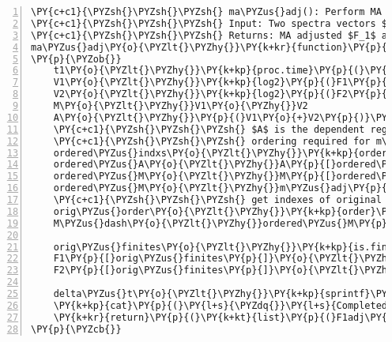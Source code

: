 \begin{Verbatim}[commandchars=\\\{\},codes={\catcode`\$=3\catcode`\^=7\catcode`\_=8},gobble=0,numbers=left,fontfamily=fvm,fontshape=n,fontsize=\footnotesize,tabsize=2]
\PY{c+c1}{\PYZsh{}\PYZsh{}\PYZsh{} ma\PYZus{}adj(): Perform MA adjustment on two vectors}
\PY{c+c1}{\PYZsh{}\PYZsh{}\PYZsh{} Input: Two spectra vectors $F_1$ and $F_2$}
\PY{c+c1}{\PYZsh{}\PYZsh{}\PYZsh{} Returns: MA adjusted $F_1$ and $F_2$ values, $F_1^*$ and $F_2^*$ respectively}
ma\PYZus{}adj\PY{o}{\PYZlt{}\PYZhy{}}\PY{k+kr}{function}\PY{p}{(}F1\PY{p}{,}F2\PY{p}{)}
\PY{p}{\PYZob{}}
	t1\PY{o}{\PYZlt{}\PYZhy{}}\PY{k+kp}{proc.time}\PY{p}{(}\PY{p}{)}\PY{p}{[}\PY{l+m}{3}\PY{p}{]} \PY{c+c1}{\PYZsh{}\PYZsh{}\PYZsh{} get start time}
	V1\PY{o}{\PYZlt{}\PYZhy{}}\PY{k+kp}{log2}\PY{p}{(}F1\PY{p}{)} \PY{c+c1}{\PYZsh{} Will produce $-\infty$ for $\log_2(0)$}
	V2\PY{o}{\PYZlt{}\PYZhy{}}\PY{k+kp}{log2}\PY{p}{(}F2\PY{p}{)}
	M\PY{o}{\PYZlt{}\PYZhy{}}V1\PY{o}{\PYZhy{}}V2
	A\PY{o}{\PYZlt{}\PYZhy{}}\PY{p}{(}V1\PY{o}{+}V2\PY{p}{)}\PY{o}{/}\PY{l+m}{2}
	\PY{c+c1}{\PYZsh{}\PYZsh{}\PYZsh{} $A$ is the dependent regression variable,}
	\PY{c+c1}{\PYZsh{}\PYZsh{}\PYZsh{} ordering required for m\PYZus{}adj function}
	ordered\PYZus{}indxs\PY{o}{\PYZlt{}\PYZhy{}}\PY{k+kp}{order}\PY{p}{(}A\PY{p}{)}
	ordered\PYZus{}A\PY{o}{\PYZlt{}\PYZhy{}}A\PY{p}{[}ordered\PYZus{}indxs\PY{p}{]}
	ordered\PYZus{}M\PY{o}{\PYZlt{}\PYZhy{}}M\PY{p}{[}ordered\PYZus{}indxs\PY{p}{]}
	ordered\PYZus{}M\PY{o}{\PYZlt{}\PYZhy{}}m\PYZus{}adj\PY{p}{(}ordered\PYZus{}M\PY{p}{,}ordered\PYZus{}A\PY{p}{)}
	\PY{c+c1}{\PYZsh{}\PYZsh{}\PYZsh{} get indexes of original ordering}
	orig\PYZus{}order\PY{o}{\PYZlt{}\PYZhy{}}\PY{k+kp}{order}\PY{p}{(}ordered\PYZus{}indxs\PY{p}{)}
	M\PYZus{}dash\PY{o}{\PYZlt{}\PYZhy{}}ordered\PYZus{}M\PY{p}{[}orig\PYZus{}order\PY{p}{]}
	
	orig\PYZus{}finites\PY{o}{\PYZlt{}\PYZhy{}}\PY{k+kp}{is.finite}\PY{p}{(}M\PY{p}{)} \PY{c+c1}{\PYZsh{}update values requiring updating}
	F1\PY{p}{[}orig\PYZus{}finites\PY{p}{]}\PY{o}{\PYZlt{}\PYZhy{}}\PY{l+m}{2}\PY{o}{\PYZca{}}\PY{p}{(}A\PY{p}{[}orig\PYZus{}finites\PY{p}{]}\PY{o}{+}M\PYZus{}dash\PY{p}{[}orig\PYZus{}finites\PY{p}{]}\PY{o}{/}\PY{l+m}{2}\PY{p}{)}
	F2\PY{p}{[}orig\PYZus{}finites\PY{p}{]}\PY{o}{\PYZlt{}\PYZhy{}}\PY{l+m}{2}\PY{o}{\PYZca{}}\PY{p}{(}A\PY{p}{[}orig\PYZus{}finites\PY{p}{]}\PY{o}{\PYZhy{}}M\PYZus{}dash\PY{p}{[}orig\PYZus{}finites\PY{p}{]}\PY{o}{/}\PY{l+m}{2}\PY{p}{)}
	
	delta\PYZus{}t\PY{o}{\PYZlt{}\PYZhy{}}\PY{k+kp}{sprintf}\PY{p}{(}\PY{l+s}{\PYZdq{}}\PY{l+s}{\PYZpc{}.2f\PYZdq{}}\PY{p}{,}\PY{k+kp}{proc.time}\PY{p}{(}\PY{p}{)}\PY{p}{[}\PY{l+m}{3}\PY{p}{]}\PY{o}{\PYZhy{}}t1\PY{p}{)} \PY{c+c1}{\PYZsh{}\PYZsh{}\PYZsh{} time elapsed}
	\PY{k+kp}{cat}\PY{p}{(}\PY{l+s}{\PYZdq{}}\PY{l+s}{Completed MA Normalisation in\PYZdq{}}\PY{p}{,}delta\PYZus{}t\PY{p}{,}\PY{l+s}{\PYZdq{}}\PY{l+s}{seconds \PYZbs{}n\PYZdq{}}\PY{p}{)}
	\PY{k+kr}{return}\PY{p}{(}\PY{k+kt}{list}\PY{p}{(}F1adj\PY{o}{=}F1\PY{p}{,}F2adj\PY{o}{=}F2\PY{p}{)}\PY{p}{)}
\PY{p}{\PYZcb{}}
\end{Verbatim}
